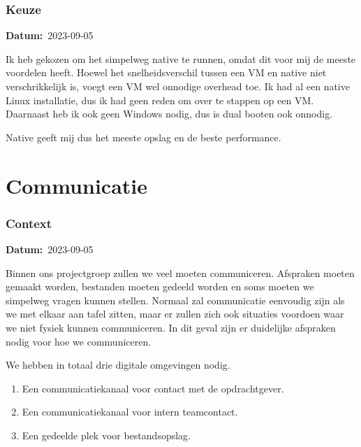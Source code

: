 \documentclass[a4paper]{report}
\newcommand{\teambox}{
  \begin{tcolorbox}[hbox, colback=blue!5!white,colframe=blue!75!black,
    left=.1mm, right=.1mm, top=.1mm, bottom=.1mm, fontupper=\scriptsize\sffamily]
    Team Keuze
  \end{tcolorbox}
}
\newcommand{\teamchoice}[1]{
  \section[ #1 ]{#1~\mbox{\raisebox{-2.5pt}{\teambox}}}
}
\newcommand{\timestamp}[1]{
  \mbox{\scriptsize \textbf{Datum:} #1} \smallbreak
}
\begin{document}
\subsubsection{Keuze}
\timestamp{2023-09-05}
Ik heb gekozen om het simpelweg native te runnen, omdat dit voor mij de meeste voordelen heeft.
Hoewel het snelheidsverschil tussen een VM en native niet verschrikkelijk is, voegt een VM wel onnodige overhead toe. 
Ik had al een native Linux installatie, dus ik had geen reden om over te stappen op een VM. 
Daarnaast heb ik ook geen Windows nodig, dus is dual booten ook onnodig. 
\par\smallskip
Native geeft mij dus het meeste opslag en de beste performance. 


\teamchoice{Communicatie}
\subsubsection{Context}
\timestamp{2023-09-05}
Binnen ons projectgroep zullen we veel moeten communiceren. Afspraken moeten gemaakt worden, bestanden moeten gedeeld worden en soms moeten we simpelweg vragen kunnen stellen.
Normaal zal communicatie eenvoudig zijn als we met elkaar aan tafel zitten, maar er zullen zich ook situaties voordoen waar we niet fysiek kunnen communiceren.
In dit geval zijn er duidelijke afspraken nodig voor hoe we communiceren.
\par \smallskip 
We hebben in totaal drie digitale omgevingen nodig.
\begin{enumerate}
  \item Een communicatiekanaal voor contact met de opdrachtgever.
  \item Een communicatiekanaal voor intern teamcontact.
  \item Een gedeelde plek voor bestandsopslag.
\end{enumerate}
\end{document}
